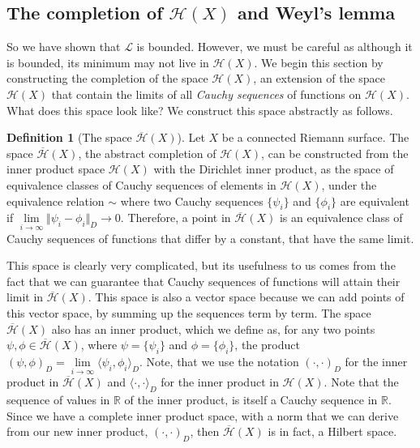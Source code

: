 \documentclass[11pt]{report}
\theoremstyle{definition}
\newtheorem{defn}[thm]{Definition}
\begin{document}
\subsection{The completion of $\mathcal{H}(X)$ and Weyl's lemma}
So we have shown that $\mathcal{L}$ is bounded. However, we must be careful as although it is bounded, its minimum may not live in $\mathcal{H}(X)$. We begin this section by constructing the completion of the space $\mathcal{H}(X)$, an extension of the space $\mathcal{H}(X)$ that contain the limits of all \emph{Cauchy sequences} of functions on $\mathcal{H}(X)$. What does this space look like? We construct this space abstractly as follows.
\begin{defn}[The space $\overline{\mathcal{H}}(X)$]\label{completeH}
  Let $X$ be a connected Riemann surface. The space $\overline{\mathcal{H}}(X)$, the abstract completion of $\mathcal{H}(X)$, can be constructed from the inner product space $\mathcal{H}(X)$ with the Dirichlet inner product, as the space of equivalence classes of Cauchy sequences of elements in $\mathcal{H}(X)$, under the equivalence relation $\sim$ where two Cauchy sequences $\{\psi_i\}$ and $\{\phi_i\}$ are equivalent if $\lim\limits_{i \rightarrow \infty}\Vert \psi_i - \phi_i\Vert_D \rightarrow 0 $.
  Therefore, a point in $\overline{\mathcal{H}}(X)$ is an equivalence class of Cauchy sequences of functions that differ by a constant, that have the same limit.
\end{defn}
This space is clearly very complicated, but its usefulness to us comes from the fact that we can guarantee that Cauchy sequences of functions will attain their limit in $\overline{\mathcal{H}}(X)$. This space is also a vector space because we can add points of this vector space, by summing up the sequences term by term. The space $\overline{\mathcal{H}}(X)$ also has an inner product, which we define as, for any two points $\psi, \phi \in \overline{\mathcal{H}}(X)$, where $\psi = \{\psi_i\}$ and $\phi = \{\phi_i\}$, the product $( \psi, \phi )_D = \lim\limits_{i \rightarrow \infty} \langle \psi_i, \phi_i \rangle_D$. Note, that we use the notation $( \cdot, \cdot)_D$ for the inner product in $\overline{\mathcal{H}}(X)$ and $\langle \cdot, \cdot \rangle_D$ for the inner product in $\mathcal{H}(X)$. Note that the sequence of values in $\mathbb{R}$ of the inner product, is itself a Cauchy sequence in $\mathbb{R}$. Since we have a complete inner product space, with a norm that we can derive from our new inner product, $( \cdot, \cdot )_D$, then $\overline{\mathcal{H}}(X)$ is in fact, a Hilbert space. 
\end{document}
